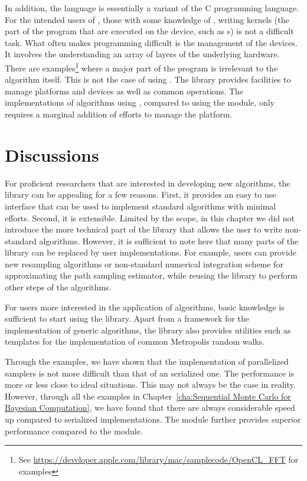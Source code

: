 In addition, the \opencl language is essentially a variant of the C
programming language. For the intended users of \vsmc, those with some
knowledge of \cpp, writing \opencl kernels (the part of the program that are
executed on the device, such as \gpu{}s) is not a difficult task. What often
makes \opencl programming difficult is the management of the devices. It
involves the understanding an array of layers of the underlying hardware.
There are examples\footnote{See \url{https://developer.apple.com/library/mac/samplecode/OpenCL_FFT} for examples}
where a major part of the program is irrelevant to the algorithm itself. This
is not the case of using \vsmc. The library provides facilities to manage
\opencl platforms and devices as well as common operations. The
implementations of \smc algorithms using \opencl, compared to using the \smp
module, only requires a marginal addition of efforts to manage the \opencl
platform.

\section{Discussions}
\label{sec:vSMC Discussion}

For \cpp proficient researchers that are interested in developing new
algorithms, the \vsmc library can be appealing for a few reasons. First, it
provides an easy to use interface that can be used to implement standard
algorithms with minimal efforts. Second, it is extensible. Limited by the
scope, in this chapter we did not introduce the more technical part of the
library that allows the user to write non-standard algorithms. However, it is
sufficient to note here that many parts of the library can be replaced by user
implementations. For example, users can provide new resampling algorithms or
non-standard numerical integration scheme for approximating the path sampling
estimator, while reusing the library to perform other steps of the algorithms.

For users more interested in the application of \smc algorithms, basic \cpp
knowledge is sufficient to start using the library. Apart from a framework for
the implementation of generic \smc algorithms, the library also provides
utilities such as templates for the implementation of common Metropolis random
walks.

Through the examples, we have shown that the implementation of parallelized
samplers is not more difficult than that of an serialized one. The performance
is more or less close to ideal situations. This may not always be the case in
reality. However, through all the examples in Chapter~\ref{cha:Sequential
  Monte Carlo for Bayesian Computation}, we have found that there are always
considerable speed up compared to serialized implementations. The \opencl
module further provides superior performance compared to the \smc module.

